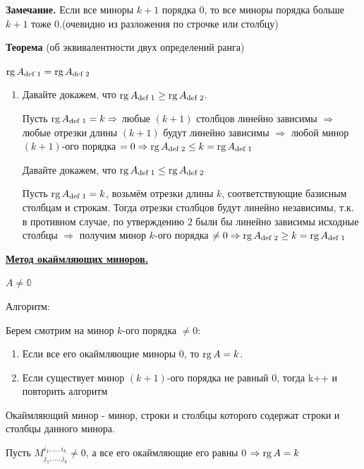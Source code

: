 \textbf{Замечание.}  Если все миноры \(k+1\) порядка 0, то все миноры порядка больше \(k+1\) тоже 0.(очевидно из разложения по строчке или столбцу)

\textbf{Теорема} (об эквивалентности двух определений ранга)

\( \operatorname{rg} A_{\text{def 1}} = \operatorname{rg} A_{\text{def 2}}\)

\begin{enumerate}
    \item[]\prooff{} Давайте докажем, что \( \operatorname{rg} A_{\text{def 1}} \geq \operatorname{rg} A_{\text{def 2}}\).

          Пусть $\operatorname{rg}\space A_{\text{def 1}} = k \Rightarrow$ любые $(k + 1)$ столбцов линейно зависимы $\Rightarrow$ любые отрезки длины $(k + 1)$ будут линейно зависимы $\Rightarrow$ любой минор $(k + 1)$-ого порядка $ = 0 \Rightarrow \operatorname{rg}\space A_{\text{def 2}} \leq k = \operatorname{rg}\space A_{\text{def 1}}$ 


          Давайте докажем, что \( \operatorname{rg} A_{\text{def 1}} \leq \operatorname{rg} A_{\text{def 2}}\)

          Пусть $\operatorname{rg}\space A_{\text{def 1}} = k$, возьмём отрезки длины $k$, соответствующие базисным столбцам и строкам. Тогда отрезки столбцов будут линейно независимы, т.к. в противном случае, по утверждению 2 были бы линейно зависимы исходные столбцы $\Rightarrow$ получим минор $k$-ого порядка $\neq 0 \Rightarrow \operatorname{rg}\space A_{\text{def 2}} \geq k = \operatorname{rg}\space A_{\text{def 1}}$

\end{enumerate}



\uline{\textbf{Метод окаймляющих миноров.}}

\(A \neq \mathbb{0}\)

Алгоритм:

Берем смотрим на минор \(k\)-ого порядка $\neq 0$:
\begin{enumerate}
    \item Если все его окаймляющие миноры 0, то \(\operatorname{rg} A = k\).
    \item Если существует минор $(k+1)$-ого порядка не равный 0, тогда k++ и повторить алгоритм
\end{enumerate}

Окаймляющий минор - минор, строки и столбцы которого содержат строки и столбцы данного минора.

Пусть \(M_{j_1, \ldots, j_k}^{i_1, \ldots, i_k} \neq 0\), а все его окаймляющие его равны 0 \(\Rightarrow \operatorname{rg} A = k\)

